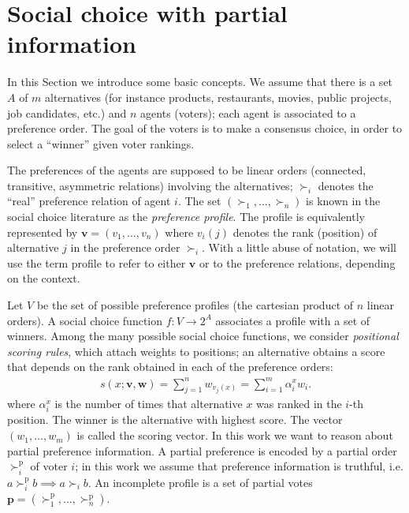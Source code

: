 \documentclass[12pt]{article}
\newcommand{\pref}{\succ}%
\newcommand{\ppref}{\succ^\text{p}}%
\newcommand{\profile}{\textbf{v}}%
\newcommand{\w}{\textbf{w}}%
\begin{document}
\section{Social choice with partial information}\label{sec:background}

In this Section we introduce some basic concepts.
We assume that there is a set $A$ of $m$ alternatives (for instance products, restaurants, movies, public projects, job candidates, etc.) and $n$ agents (voters); each agent is associated to a preference order.
The goal of the voters is to make a consensus choice, in order to select a ``winner'' given voter rankings.

The preferences of the agents are supposed to be linear orders (connected, transitive, asymmetric relations) involving the alternatives;
$\pref_i$ denotes the ``real'' preference relation of agent $i$. 
The set $(\pref_1,\ldots,\pref_n)$ is known in the social choice literature as the {\em preference  profile}.
The profile is equivalently represented by $\profile=(v_1,\ldots,v_n)$ where $v_i(j)$ denotes the rank (position) of alternative $j$ in the preference order $\pref_i$. 
With a little abuse of notation, we will use the term profile to refer to either $\profile$ or to the preference relations, depending on the context.

Let $V$ be the set of possible preference profiles (the cartesian product of $n$ linear orders).
A social choice function $f : V \rightarrow 2^A$ associates a profile with a set of winners.
Among the many possible social choice functions, we consider {\em positional scoring rules}, which attach weights to positions; 
an alternative obtains a score that depends on the rank obtained in each of the preference orders:
\begin{align}
s(x; \profile, \w) = \sum_{j=1}^{n} w_{v_j(x)}
= \sum_{i=1}^{m} \alpha^{x}_i w_i . \label{eq:srule}
\end{align}
where $\alpha^{x}_i$ is the number of times that alternative $x$ was ranked in the $i$-th position.
The winner is the alternative with highest score.
The vector $(w_1,\ldots,w_m)$ is called the scoring vector.
In this work we want to reason about partial preference information.
A partial preference  is encoded by a partial order $\ppref_i$  of voter $i$; in this work we assume that preference information is truthful, i.e. $a \ppref_i b \implies a \pref_i b$.
An incomplete profile is a set of partial votes  $\textbf{p}=(\ppref_1,\ldots,\ppref_n)$.
\end{document}
